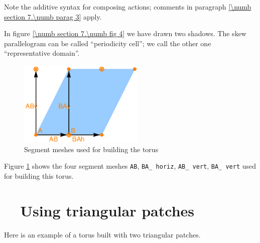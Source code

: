 Note the additive syntax for composing actions; comments in paragraph
\ref{\numb section 7.\numb parag 3} apply.

In figure \ref{\numb section 7.\numb fig 4} we have drawn two shadows.
The skew parallelogram can be called ``periodicity cell'';
we call the other one ``representative domain''.

\begin{figure}[ht] \centering
  \includegraphics[width=60mm]{torus-sketch.eps}
  \caption{Segment meshes used for building the torus}
  \label{\numb section 7.\numb fig 5}
\end{figure}

Figure \ref{\numb section 7.\numb fig 5} shows the four segment meshes {\small\tt AB},
{\small\tt BA\_\,horiz}, {\small\tt AB\_\,vert}, {\small\tt BA\_\,vert} used for
building this torus.



\section{~~Using triangular patches}\label{\numb section 7.\numb parag 9}

Here is an example of a torus built with two triangular patches.

